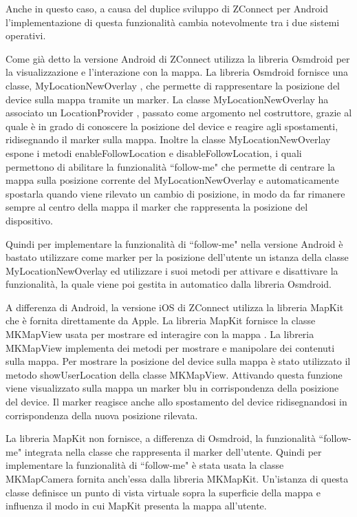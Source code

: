 Anche in questo caso, a causa del duplice sviluppo di ZConnect per Android l'implementazione di questa funzionalità cambia notevolmente tra i due sistemi operativi.

Come già detto la versione Android di ZConnect utilizza la libreria Osmdroid \cite{OpenStreetMapWiki} per la visualizzazione e l'interazione con la mappa. La libreria Osmdroid fornisce una classe, MyLocationNewOverlay \cite{MyLocationNewOverlay}, che permette di rappresentare la posizione del device sulla mappa tramite un marker. La classe MyLocationNewOverlay ha associato un LocationProvider \cite{LocationProvider}, passato come argomento nel costruttore, grazie al quale è in grado di conoscere la posizione del device e reagire agli spostamenti, ridisegnando il marker sulla mappa. Inoltre la classe MyLocationNewOverlay espone i metodi enableFollowLocation e disableFollowLocation, i quali permettono di abilitare la funzionalità ``follow-me" che permette di centrare la mappa sulla posizione corrente del MyLocationNewOverlay e automaticamente spostarla quando viene rilevato un cambio di posizione, in modo da far rimanere sempre al centro della mappa il marker che rappresenta la posizione del dispositivo.

Quindi per implementare la funzionalità di ``follow-me" nella versione Android è bastato utilizzare come marker per la posizione dell'utente un istanza della classe MyLocationNewOverlay ed utilizzare i suoi metodi per attivare e disattivare la funzionalità, la quale viene poi gestita in automatico dalla libreria Osmdroid.

A differenza di Android, la versione iOS di ZConnect utilizza la libreria MapKit \cite{MapKitDoc} che è fornita direttamente da Apple.
La libreria MapKit fornisce la classe MKMapView usata per mostrare ed interagire con la mappa \cite{MKMapView}. La libreria MKMapView implementa dei metodi per mostrare e manipolare dei contenuti sulla mappa. Per mostrare la posizione del device sulla mappa è stato utilizzato il metodo showUserLocation della classe MKMapView. Attivando questa funzione viene visualizzato sulla mappa un marker blu in corrispondenza della posizione del device. Il marker reagisce anche allo spostamento del device ridisegnandosi in corrispondenza della nuova posizione rilevata.

La libreria MapKit non fornisce, a differenza di Osmdroid, la funzionalità ``follow-me" integrata nella classe che rappresenta il marker dell'utente. Quindi per implementare la funzionalità di ``follow-me" è stata usata la classe MKMapCamera \cite{MKMapCamera} fornita anch'essa dalla libreria MKMapKit. Un'istanza di questa classe definisce un punto di vista virtuale sopra la superficie della mappa e influenza il modo in cui MapKit presenta la mappa all'utente.

